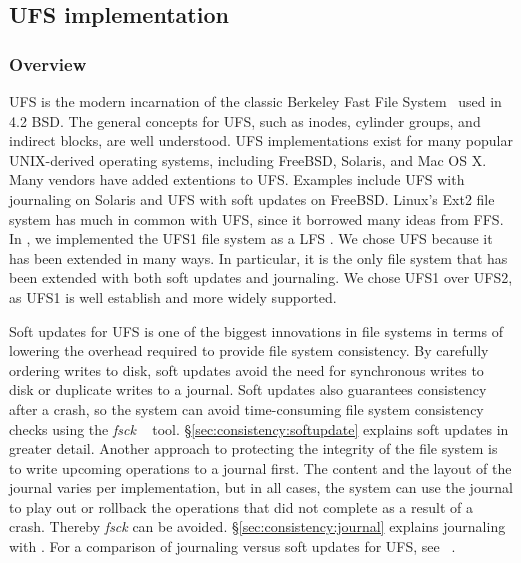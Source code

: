 \subsection{UFS implementation}
\label{sec:modules:ufs}

\subsubsection {Overview}
UFS is the modern incarnation of the classic Berkeley Fast File
System~\cite{mckusick84fast} used in 4.2 BSD. The general concepts for UFS, such
as inodes, cylinder groups, and indirect blocks, are well understood. UFS
implementations exist for many popular UNIX-derived operating systems, including
FreeBSD, Solaris, and Mac OS X. Many vendors have added extentions to UFS.
Examples include UFS with journaling on Solaris and UFS with soft updates on
FreeBSD. Linux's Ext2 file system has much in common with UFS, since it borrowed
many ideas from FFS. In \Kudos, we implemented the UFS1 file system as a LFS
\module. We chose UFS because it has been extended in many ways. In particular,
it is the only file system that has been extended with both soft updates and
journaling. We chose UFS1 over UFS2, as UFS1 is well establish and more widely
supported.

Soft updates for UFS is one of the biggest innovations in file systems in terms
of lowering the overhead required to provide file system consistency. By
carefully ordering writes to disk, soft updates avoid the need for synchronous
writes to disk or duplicate writes to a journal. Soft updates also guarantees
consistency after a crash, so the system can avoid time-consuming file system
consistency checks using the \emph{fsck} ~\cite{mckusick94fsck} tool.
\S\ref{sec:consistency:softupdate} explains soft updates in greater detail.
Another approach to protecting the integrity of the file system is to write
upcoming operations to a journal first. The content and the layout of the
journal varies per implementation, but in all cases, the system can use the
journal to play out or rollback the operations that did not complete as a result
of a crash. Thereby \emph{fsck} can be avoided. \S\ref{sec:consistency:journal}
explains journaling with \chdescs. For a comparison of journaling versus soft
updates for UFS, see ~\cite{seltzer00journaling}.

